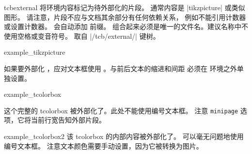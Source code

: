 \begin{docEnvironment}[doc new=2015-03-11]{tcbexternal}{}
将环境内容标记为待外部化的片段。
通常内容是 |tikzpicture| 或类似图形。
请注意，片段不应与文档其余部分有任何依赖关系，
例如不能引用计数器或设置计数器。
会自动添加  前缀。
组合起来必须是唯一的文件名。建议名称中不使用空格或变音符号。
取自 |/tcb/external/| 键树。

\begin{dispExample}
\begin{tcbexternal}{example_tikzpicture}
\end{tcbexternal}
\end{dispExample}

\medskip

如果要外部化 ，应对文本框使用
。与前后文本的缩进和间距
必须在  环境之外单独设置。

\begin{dispExample}
\noindent%
\begin{tcbexternal}[minipage]{example_tcolorbox}
  \begin{tcolorbox}[nobeforeafter,enhanced,
      fonttitle=\bfseries,title=外部化文本框,
      colframe=red!50!black,drop fuzzy shadow,
      interior style={fill overzoom image=goldshade.png}]
    这个完整的 tcolorbox 被外部化了。此处不能使用编号文本框。
    注意 \texttt{minipage} 选项，它将当前行宽告知外部片段。
  \end{tcolorbox}
\end{tcbexternal}
\end{dispExample}

\begin{dispExample}
\begin{tcolorbox}[nobeforeafter,enhanced,
      fonttitle=\bfseries,title=外部化文本框,
      colframe=blue!50!black,
      interior style={fill overzoom image=blueshade.png}]
  \begin{tcbexternal}[minipage]{example_tcolorbox2}
    \color{white}%
    该 tcolorbox 的内部内容被外部化了。
    可以毫无问题地使用编号文本框。
    注意文本颜色需要手动设置，因为它被转换为图片。
  \end{tcbexternal}
\end{tcolorbox}
\end{dispExample}


\end{docEnvironment}
